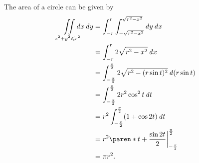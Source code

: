 \documentclass[a4paper]{article}
\let\leq\leqslant
\let\le\leq
\begin{document}
The area of a circle can be given by
\begin{align*}
  \iint\limits_{\mathclap{x^2 + y^2 \le r^2}} \dx\dy
  &= \int_{-r}^{r} \int_{-\sqrt{r^2 - x^2}}^{\sqrt{r^2 - x^2}} \dy \dx \\
  &= \int_{-r}^{r} 2 \sqrt{r^2 - x^2} \dx \\
  &= \int_{-\frac\pi2}^{\frac\pi2} 2 \sqrt{r^2 - (r \sin t)^2} \diff (r \sin t) \\
  &= \int_{-\frac\pi2}^{\frac\pi2} 2r^2 \cos^2 t \dt \\
  &= r^2 \int_{-\frac\pi2}^{\frac\pi2} (1 + \cos 2t) \dt \\
  &= r^2 \paren*{t + \frac{\sin 2t}{2}} \bigg\vert_{-\frac\pi2}^{\frac\pi2} \\
  &= \pi r^2.
\end{align*}
\end{document}
